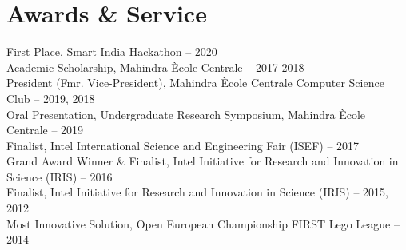 \documentclass[a4paper,11pt]{article}
\begin{document}
{{%
\section{Awards \& Service}
    {\small
    \begin{adjustwidth}{10pt}{}
        First Place, Smart India Hackathon -- 2020 \\
        Academic Scholarship, Mahindra \`{E}cole Centrale -- 2017-2018 \\
        President (Fmr. Vice-President), Mahindra \`{E}cole Centrale Computer Science Club -- 2019, 2018 \\
        Oral Presentation, Undergraduate Research Symposium, Mahindra \`{E}cole Centrale -- 2019 \\
        Finalist, Intel International Science and Engineering Fair (ISEF) -- 2017 \\
        Grand Award Winner \& Finalist, Intel Initiative for Research and Innovation in Science (IRIS) -- 2016 \\
        Finalist, Intel Initiative for Research and Innovation in Science (IRIS) -- 2015, 2012 \\
        Most Innovative Solution, Open European Championship FIRST Lego League -- 2014
    \end{adjustwidth}
    }

}}
\end{document}
